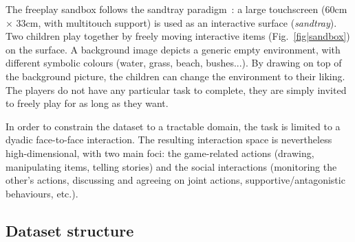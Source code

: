 \documentclass{article}
\begin{document}
The freeplay sandbox follows the sandtray
paradigm~\cite{baxter2012touchscreen}: a large touchscreen (60cm $\times$ 33cm,
with multitouch support) is used as an interactive surface (\emph{sandtray}). Two children play together
by freely moving interactive items (Fig.~\ref{fig|sandbox}) on the surface. A background image
depicts a generic empty environment, with different symbolic colours (water,
grass, beach, bushes...). By drawing on top of the background picture, the
children can change the environment to their liking. The players do not have any particular task to
complete, they are simply invited to freely play for as long as they want.

In order to constrain the dataset to a tractable domain, the task is limited to
a dyadic face-to-face interaction.  The resulting interaction space is
nevertheless high-dimensional, with two main foci: the game-related actions
(drawing, manipulating items, telling stories) and the social interactions
(monitoring the other's actions, discussing and agreeing on joint actions,
supportive/antagonistic behaviours, etc.).

%
%
%
%
%



\subsection{Dataset structure}
\end{document}
